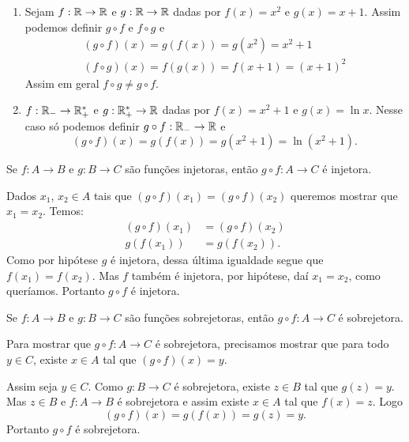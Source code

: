 \begin{exemplos}
    \begin{enumerate}[label={\arabic*})]
        \item Sejam $f : \mathbb{R} \to \mathbb{R}$ e $g : \mathbb{R} \to \mathbb{R}$ dadas por $f(x) = x^2$ e $g(x) = x + 1$. Assim podemos definir $g \circ f$ e $f \circ g$ e
        \begin{align*}
            (g\circ f)(x) = g(f(x)) = g(x^2) = x^2 + 1\\
            (f\circ g)(x) = f(g(x)) = f(x + 1) = (x + 1)^2
        \end{align*}
        Assim em geral $f \circ g \ne g \circ f$.

        \item $f : \mathbb{R}_- \to \mathbb{R}^*_+$ e $g : \mathbb{R}^*_+ \to \mathbb{R}$ dadas por $f(x) = x^2 + 1$ e $g(x) = \ln x$. Nesse caso só podemos definir $g \circ f : \mathbb{R}_- \to \mathbb{R}$ e
        \[
            (g\circ f)(x) = g(f(x)) = g(x^2 + 1) = \ln(x^2 + 1).
        \]
    \end{enumerate}
\end{exemplos}

\begin{proposicao}\label{composicao_funcoes_injetoras}
    Se $f : A \to B$ e $g : B \to C$ são funções injetoras, então $g\circ f : A \to C$ é injetora.
\end{proposicao}
\begin{prova}
    Dados $x_1$, $x_2 \in A$ tais que $(g\circ f)(x_1) = (g\circ f)(x_2)$ queremos mostrar que $x_1 = x_2$. Temos:
    \begin{align*}
        (g\circ f)(x_1) &= (g\circ f)(x_2)\\
        g(f(x_1)) &= g(f(x_2)).
    \end{align*}
    Como por hipótese $g$ é injetora, dessa última igualdade segue que $f(x_1) = f(x_2)$. Mas $f$ também é injetora, por hipótese, daí $x_1 = x_2$, como queríamos. Portanto $g\circ f$ é injetora.
\end{prova}

\begin{proposicao}\label{composicao_funcoes_sobrejetoras}
    Se $f : A \to B$ e $g : B \to C$ são funções sobrejetoras, então $g\circ f : A \to C$ é sobrejetora.
\end{proposicao}
\begin{prova}
     Para mostrar que $g \circ f : A \to C$ é sobrejetora, precisamos mostrar que para todo $y \in C$, existe $x \in A$ tal que $(g\circ f)(x) = y$.

     Assim seja $y \in C$. Como $g : B \to C$ é sobrejetora, existe $z \in B$ tal que $g(z) = y$. Mas $z \in B$ e $f : A \to B$ é sobrejetora e assim existe $x \in A$ tal que $f(x) = z$. Logo
     \[
         (g\circ f)(x) = g(f(x)) = g(z) = y.
     \]
     Portanto $g \circ f$ é sobrejetora.
\end{prova}


